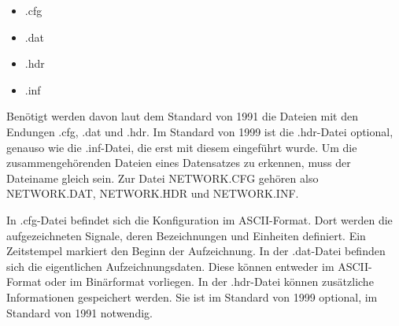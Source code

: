 \documentclass{scrartcl}
\begin{document}
\begin{onehalfspace}
\begin{itemize}
\item .cfg
\item .dat
\item .hdr
\item .inf
\end{itemize}

Benötigt werden davon laut dem Standard von 1991 die Dateien mit den Endungen .cfg, .dat und .hdr. Im Standard von 1999 ist die .hdr-Datei optional, genauso wie die .inf-Datei, die erst mit diesem eingeführt wurde. Um die zusammengehörenden Dateien eines Datensatzes zu erkennen, muss der Dateiname gleich sein. Zur Datei NETWORK.CFG gehören also NETWORK.DAT, NETWORK.HDR und NETWORK.INF.

In .cfg-Datei befindet sich die Konfiguration im ASCII-Format. Dort werden die aufgezeichneten Signale, deren Bezeichnungen und Einheiten definiert. Ein Zeitstempel markiert den Beginn der Aufzeichnung. In der .dat-Datei befinden sich die eigentlichen Aufzeichnungsdaten. Diese können entweder im ASCII-Format oder im Binärformat vorliegen. In der .hdr-Datei können zusätzliche Informationen gespeichert werden. Sie ist im Standard von 1999 optional, im Standard von 1991 notwendig.


\end{onehalfspace}
\end{document}
